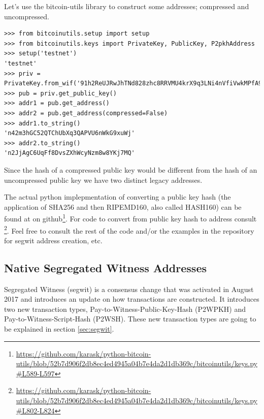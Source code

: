 Let's use the bitcoin-utils library to construct some addresses; compressed and uncompressed.

\vspace{1em}
\begin{lstlisting}[style=Python,label={lst:display-addresses},caption={Python example to generate compressed and uncompressed addresses},captionpos=b]
>>> from bitcoinutils.setup import setup
>>> from bitcoinutils.keys import PrivateKey, PublicKey, P2pkhAddress
>>> setup('testnet')
'testnet' 
>>> priv = PrivateKey.from_wif('91h2ReUJRwJhTNd828zhc8RRVMU4krX9q3LNi4nVfiVwkMPfA9p')
>>> pub = priv.get_public_key()  
>>> addr1 = pub.get_address()
>>> addr2 = pub.get_address(compressed=False)
>>> addr1.to_string()
'n42m3hGC52QTChUbXq3QAPVU6nWkG9xuWj' 
>>> addr2.to_string() 
'n2JjAgC6UqFf8DvsZXhWcyNzm8w8YKj7MQ'
\end{lstlisting}
\vspace{1em}

\begin{note}
Since the hash of a compressed public key would be different from the hash of an uncompressed public key we have two distinct legacy addresses.
\end{note}

The actual python implepmentation of converting a public key hash (the application of SHA256 and then RIPEMD160, also called HASH160) can be found at  on github\footnote{\url{https://github.com/karask/python-bitcoin-utils/blob/52b7d906f2db8ec4ed4945a04b7e4da2d1db369c/bitcoinutils/keys.py\#L589-L597}}. For code to convert from public key hash to address consult \footnote{\url{https://github.com/karask/python-bitcoin-utils/blob/52b7d906f2db8ec4ed4945a04b7e4da2d1db369c/bitcoinutils/keys.py\#L802-L824}}. Feel free to consult the rest of the code and/or the examples in the repository for segwit address creation, etc.


\subsection*{Native Segregated Witness Addresses}

Segregated Witness (segwit) is a consensus change that was activated in August 2017 and introduces an update on how transactions are constructed. It introduces two new transaction types, Pay-to-Witness-Public-Key-Hash (P2WPKH) and Pay-to-Witness-Script-Hash (P2WSH). These new transaction types are going to be explained in section \ref{sec:segwit}.

